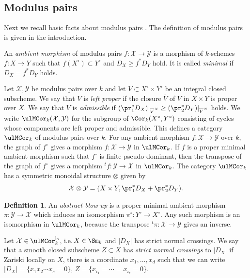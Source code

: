 \documentclass{amsart}
\theoremstyle{plain}
\theoremstyle{definition}
\newtheorem{definition}[theorem]{Definition}
\theoremstyle{remark}
\numberwithin{equation}{section}
\def\ls{\mathrm{ls}}
\begin{document}
\subsection{Modulus pairs}

Next we recall basic facts about modulus pairs \cite{KMSY1}.
The definition of modulus pairs is given in the introduction.

An \emph{ambient morphism} of modulus pairs $f\colon \mathcal{X}\to \mathcal{Y}$ is a morphism of $k$-schemes $f\colon X\to Y$ such that $f(X^\circ)\subset Y^\circ$ and $D_X\geq f^*D_Y$ hold.
It is called \emph{minimal} if $D_X=f^*D_Y$ holds.

Let $\mathcal{X},\mathcal{Y}$ be modulus pairs over $k$ and let $V\subset X^\circ\times Y^\circ$ be an integral closed subscheme.
We say that $V$ is \emph{left proper} if the closure $\overline{V}$ of $V$ in $X\times Y$ is proper over $X$.
We say that $V$ is \emph{admissible} if $(\pr_1^*D_X)|_{\overline{V}^N}\geq (\pr_2^*D_Y)|_{\overline{V}^N}$ holds.
We write $\ulMCor_k(\mathcal{X},\mathcal{Y})$ for the subgroup of $\Cor_k(X^\circ,Y^\circ)$ consisting of cycles whose components are left proper and admissible.
This defines a category $\ulMCor_k$ of modulus pairs over $k$.
For any ambient morphism $f\colon \mathcal{X}\to \mathcal{Y}$ over $k$, the graph of $f^\circ$ gives a morphism $f\colon \mathcal{X}\to \mathcal{Y}$ in $\ulMCor_k$.
If $f$ is a proper minimal ambient morphism such that $f^\circ$ is finite pseudo-dominant, then the transpose of the graph of $f^\circ$ gives a morphism ${}^tf\colon \mathcal{Y}\to \mathcal{X}$ in $\ulMCor_k$.
The category $\ulMCor_k$ has a symmetric monoidal structure $\otimes$ given by
$$
	\mathcal{X}\otimes \mathcal{Y}=(X\times Y, \pr_1^*D_X+\pr_2^*D_Y).
$$
\begin{definition}\label{def:abs_blow_up}
	An \emph{abstract blow-up} is a proper minimal ambient morphism $\pi\colon \mathcal{Y}\to \mathcal{X}$ which induces an isomorphism $\pi^\circ\colon Y^\circ\to X^\circ$.
Any such morphism is an isomorphism in $\ulMCor_k$, because the transpose ${}^t\pi\colon \mathcal{X}\to \mathcal{Y}$ gives an inverse.
\end{definition}

Let $\mathcal{X}\in \ulMCor_k^\ls$, i.e.\,$X\in \Sm_k$ and $|D_X|$ has strict normal crossings.
We say that a smooth closed subscheme $Z\subset X$ has \emph{strict normal crossings} to $|D_X|$ if Zariski locally on $X$, there is a coordinate $x_1,\dots,x_d$ such that we can write $|D_X|=\{x_1x_2\cdots x_s=0\}$, $Z=\{x_{i_1}=\cdots=x_{i_r}=0\}$.
\end{document}
